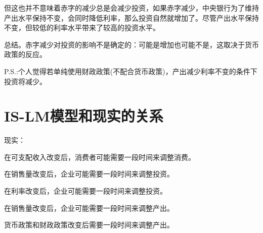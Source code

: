 \documentclass{article}
\begin{document}
但这也并不意味着赤字的减少总是会减少投资，如果赤字减少，中央银行为了维持产出水平保持不变，会同时降低利率，那么投资自然就增加了。尽管产出水平保持不变，但较低的利率水平带来了较高的投资水平。

总结。赤字减少对投资的影响不是确定的：可能是增加也可能不是，这取决于货币政策的反应。

P.S.:个人觉得若单纯使用财政政策(不配合货币政策)，产出减少利率不变的条件下投资将减少。

\section{IS-LM模型和现实的关系}

现实：

在可支配收入改变后，消费者可能需要一段时间来调整消费。

在销售量改变后，企业可能需要一段时间来调整投资。

在利率改变后，企业可能需要一段时间来调整投资。

在销售量改变后，企业可能需要一段时间来调整产出。

\hspace*{\fill}

货币政策和财政政策改变后需要一段时间来调整产出。
\end{document}
